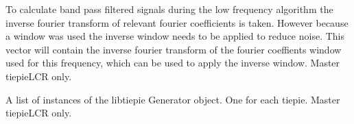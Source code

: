 \documentclass[letterpaper,10pt,english]{sphinxmanual}
\begin{document}
\begin{fulllineitems}

\begin{fulllineitems}
\label{\detokenize{index:TiePieLCR.TiePieLCR.design_bandpass_fir_filter}}
\end{fulllineitems}


\begin{fulllineitems}
\label{\detokenize{index:TiePieLCR.TiePieLCR.do_the_ffts}}
\end{fulllineitems}


\begin{fulllineitems}
\label{\detokenize{index:TiePieLCR.TiePieLCR.filt_win}}
\sphinxAtStartPar
To calculate band pass filtered signals during the low frequency algorithm the inverse fourier transform of relevant fourier coefficients is taken. However because a window was used the inverse window needs to be applied to reduce noise. This vector will contain the inverse fourier transform of the fourier coeffients window used for this frequency, which can be used to apply the inverse window. Master tiepieLCR only.

\end{fulllineitems}


\begin{fulllineitems}
\label{\detokenize{index:TiePieLCR.TiePieLCR.gen}}
\sphinxAtStartPar
A list of instances of the libtiepie Generator object. One for each tiepie. Master tiepieLCR only.


\end{fulllineitems}
\end{fulllineitems}
\end{document}
